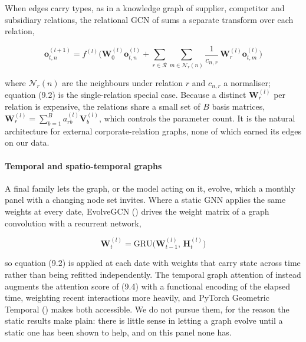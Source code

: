 When edges carry types, as in a knowledge graph of supplier, competitor and subsidiary relations, the relational GCN of \cite{schlichtkrull2018modeling} sums a separate transform over each relation,

\begin{equation}
\label{eq_gnn_6}
\mathbf{o}_{t,n}^{(l+1)} = f^{(l)}\!\Big( \mathbf{W}_0^{(l)}\mathbf{o}_{t,n}^{(l)} + \sum_{r \in \mathcal{R}} \sum_{m \in \mathcal{N}_r(n)} \frac{1}{c_{n,r}}\, \mathbf{W}_r^{(l)}\mathbf{o}_{t,m}^{(l)} \Big)
\end{equation}

where $\mathcal{N}_r(n)$ are the neighbours under relation $r$ and $c_{n,r}$ a normaliser; equation (9.2) is the single-relation special case. Because a distinct $\mathbf{W}_r^{(l)}$ per relation is expensive, the relations share a small set of $B$ basis matrices, $\mathbf{W}_r^{(l)} = \sum_{b=1}^{B} a_{rb}^{(l)}\mathbf{V}_b^{(l)}$, which controls the parameter count. It is the natural architecture for external corporate-relation graphs, none of which earned its edges on our data.

\paragraph{Temporal and spatio-temporal graphs}\label{sec_gnn_temporal}

A final family lets the graph, or the model acting on it, evolve, which a monthly panel with a changing node set invites. Where a static GNN applies the same weights at every date, EvolveGCN (\cite{pareja2020evolvegcn}) drives the weight matrix of a graph convolution with a recurrent network,

\begin{equation}
\label{eq_gnn_7}
\mathbf{W}_t^{(l)} = \mathrm{GRU}\big(\mathbf{W}_{t-1}^{(l)},\, \mathbf{H}_t^{(l)}\big)
\end{equation}

so equation (9.2) is applied at each date with weights that carry state across time rather than being refitted independently. The temporal graph attention of \cite{xu2020inductive} instead augments the attention score of (9.4) with a functional encoding of the elapsed time, weighting recent interactions more heavily, and PyTorch Geometric Temporal (\cite{rozemberczki2021pytorch}) makes both accessible. We do not pursue them, for the reason the static results make plain: there is little sense in letting a graph evolve until a static one has been shown to help, and on this panel none has.

